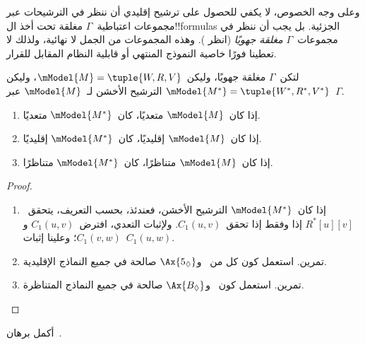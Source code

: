 \documentclass[../../../include/open-logic-section]{subfiles}
\begin{document}
وعلى وجه الخصوص، لا يكفي للحصول على ترشيح إقليدي أن ننظر في الترشيحات
عبر مجموعات اعتباطية~$\Gamma$ مغلقة تحت أخذ ال!!{formula}s الجزئية. بل
يجب أن ننظر في مجموعات~$\Gamma$ \emph{مغلقة جهويًا} (انظر
). وهذه المجموعات من الجمل لا نهائية، ولذلك
لا تعطينا فورًا خاصية النموذج المنتهي أو قابلية النظام المقابل للقرار.

\begin{thm}
  لتكن~$\Gamma$ مغلقة جهويًا، وليكن~$\mModel{M}=\tuple{W,R,V}$، وليكن
  $\mModel{M^*}=\tuple{W^*,R^*,V^*}$ الترشيح الأخشن لـ~$\mModel{M}$
  عبر~$\Gamma$.
  \begin{enumerate}
  \item إذا كان~$\mModel{M}$ متعديًا، كان~$\mModel{M^*}$ متعديًا.
  \item إذا كان~$\mModel{M}$ إقليديًا، كان~$\mModel{M^*}$ إقليديًا.
  \item إذا كان~$\mModel{M}$ متناظرًا، كان~$\mModel{M^*}$ متناظرًا.
  \end{enumerate}
\end{thm}

\begin{proof}
\begin{enumerate}
  \item إذا كان~$\mModel{M^*}$ الترشيح الأخشن، فعندئذ، بحسب التعريف،
    يتحقق~$R^*[u][v]$ إذا وفقط إذا تحقق~$C_1(u,v)$. ولإثبات التعدي،
    افترض~$C_1(u,v)$ و$C_1(v,w)$؛ وعلينا إثبات~$C_1(u,w)$.
  \item تمرين. استعمل كون كل من~ و$\Ax{5_\Diamond}$ صالحة في
    جميع النماذج الإقليدية.
  \item تمرين. استعمل كون~ و$\Ax{B_\Diamond}$ صالحة في جميع
    النماذج المتناظرة.
\end{enumerate}
\end{proof}

\begin{prob}
  أكمل برهان~.
\end{prob}
\end{document}

